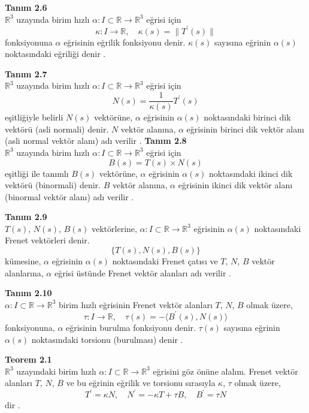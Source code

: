 \documentclass[a4paper,12pt]{article}
\begin{document}
\textbf{Tanım 2.6} \\ 
$\mathbb{R}^3$ uzayında birim hızlı $\alpha: I \subset \mathbb{R} \to \mathbb{R}^3$ eğrisi için
\[
\kappa: I \to \mathbb{R}, \quad \kappa(s) = \|T^\prime(s) \|
\]
fonksiyonuna $\alpha$ eğrisinin eğrilik fonksiyonu denir. $\kappa(s)$ sayısına eğrinin $\alpha(s)$ noktasındaki eğriliği denir \cite{ref}.

\textbf{Tanım 2.7} \\ 
$\mathbb{R}^3$ uzayında birim hızlı $\alpha: I \subset \mathbb{R} \to \mathbb{R}^3$ eğrisi için
\[
N(s) = \frac{1}{\kappa(s)} T^\prime(s)
\]
eşitliğiyle belirli $N(s)$ vektörüne, $\alpha$ eğrisinin $\alpha(s)$ noktasındaki birinci dik vektörü (asli normali) denir. $N$ vektör alanına, $\alpha$ eğrisinin birinci dik vektör alanı (asli normal vektör alanı) adı verilir \cite{ref}.
\textbf{Tanım 2.8} \\
$\mathbb{R}^3$ uzayında birim hızlı $\alpha: I \subset \mathbb{R} \to \mathbb{R}^3$ eğrisi için
\[
B(s) = T(s) \times N(s)
\]
eşitliği ile tanımlı $B(s)$ vektörüne, $\alpha$ eğrisinin $\alpha(s)$ noktasındaki ikinci dik vektörü (binormali) denir. $B$ vektör alanına, $\alpha$ eğrisinin ikinci dik vektör alanı (binormal vektör alanı) adı verilir \cite{ref}.

\textbf{Tanım 2.9} \\
$T(s)$, $N(s)$, $B(s)$ vektörlerine, $\alpha : I \subset \mathbb{R} \to \mathbb{R}^3$ eğrisinin $\alpha(s)$ noktasındaki Frenet vektörleri denir.
\[
\{T(s), N(s), B(s)\}
\]
kümesine, $\alpha$ eğrisinin $\alpha(s)$ noktasındaki Frenet çatısı ve $T$, $N$, $B$ vektör alanlarına, $\alpha$ eğrisi üstünde Frenet vektör alanları adı verilir \cite{ref}.

\textbf{Tanım 2.10} \\
$\alpha: I \subset \mathbb{R} \to \mathbb{R}^3$ birim hızlı eğrisinin Frenet vektör alanları $T$, $N$, $B$ olmak üzere,
\[
\tau : I \to \mathbb{R}, \quad \tau(s) = -\langle B^\prime(s), N(s) \rangle
\]
fonksiyonuna, $\alpha$ eğrisinin burulma fonksiyonu denir. $\tau(s)$ sayısına eğrinin $\alpha(s)$ noktasındaki torsionu (burulması) denir \cite{ref}.

\textbf{Teorem 2.1} \\
$\mathbb{R}^3$ uzayındaki birim hızlı $\alpha : I \subset \mathbb{R} \to \mathbb{R}^3$ eğrisini göz önüne alalım. Frenet vektör alanları $T$, $N$, $B$ ve bu eğrinin eğrilik ve torsionu sırasıyla $\kappa$, $\tau$ olmak üzere,
\[
T^\prime = \kappa N, \quad
N^\prime = -\kappa T + \tau B, \quad
B^\prime = \tau N
\]
dir \cite{ref}.
\end{document}
